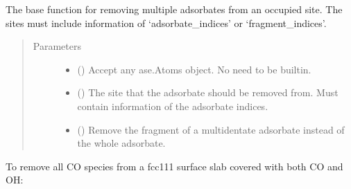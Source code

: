 \documentclass[letterpaper,10pt,english]{sphinxmanual}
\begin{document}
\begin{fulllineitems}
\label{\detokenize{build:acat.build.actions.remove_adsorbates_from_sites}}
The base function for removing multiple adsorbates from
an occupied site. The sites must include information of
‘adsorbate\_indices’ or ‘fragment\_indices’.
\begin{quote}\begin{description}
\item[{Parameters}] \leavevmode\begin{itemize}
\item {} 
 () \textendash{} Accept any ase.Atoms object. No need to be built\sphinxhyphen{}in.

\item {} 
 () \textendash{} The site that the adsorbate should be removed from.
Must contain information of the adsorbate indices.

\item {} 
 (\sphinxstyleliteralemphasis{\sphinxupquote{, }}) \textendash{} Remove the fragment of a multidentate adsorbate instead
of the whole adsorbate.

\end{itemize}

\end{description}\end{quote}

\end{fulllineitems}



To remove all CO species from a fcc111 surface slab covered
with both CO and OH:
\end{document}
